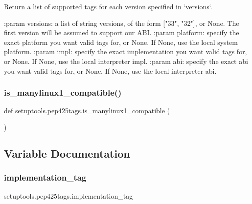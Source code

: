 \begin{DoxyVerb}Return a list of supported tags for each version specified in
`versions`.

:param versions: a list of string versions, of the form ["33", "32"],
    or None. The first version will be assumed to support our ABI.
:param platform: specify the exact platform you want valid
    tags for, or None. If None, use the local system platform.
:param impl: specify the exact implementation you want valid
    tags for, or None. If None, use the local interpreter impl.
:param abi: specify the exact abi you want valid
    tags for, or None. If None, use the local interpreter abi.
\end{DoxyVerb}
 \mbox{\label{namespacesetuptools_1_1pep425tags_adb43f3f86ca42f291e0b493973ff9613}} 
\subsubsection{\texorpdfstring{is\+\_\+manylinux1\+\_\+compatible()}{is\_manylinux1\_compatible()}}
{\footnotesize\ttfamily def setuptools.\+pep425tags.\+is\+\_\+manylinux1\+\_\+compatible (\begin{DoxyParamCaption}{ }\end{DoxyParamCaption})}



\subsection{Variable Documentation}
\mbox{\label{namespacesetuptools_1_1pep425tags_abbe9e83f958d9ddcd9ddd75982fd3d5e}} 
\subsubsection{\texorpdfstring{implementation\+\_\+tag}{implementation\_tag}}
{\footnotesize\ttfamily setuptools.\+pep425tags.\+implementation\+\_\+tag}

